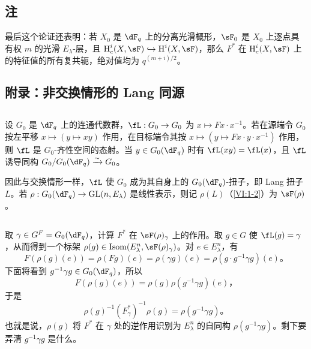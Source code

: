 \subsection{注}\label{VI:1-21}
最后这个论证还表明：若 $X_0$ 是 $\dF_q$ 上的分离光滑概形，$\sF_0$ 是 $X_0$ 上逐点具有权 $m$ 的光滑 $E_\lambda$-层，且 $\h_c^i(X,\sF)\hookrightarrow\h^i(X,\sF)$，那么 $F^\ast$ 在 $\h_c^i(X,\sF)$ 上的特征值的所有复共轭，绝对值均为 $q^{(m+i)/2}$。

\subsection*{附录：非交换情形的 Lang 同源}
\subsection{}\label{VI:1-22}
设 $G_0$ 是 $\dF_q$ 上的连通代数群，$\fL:G_0\to G_0$ 为 $x\mapsto Fx\cdot x^{-1}$。若在源端令 $G_0$ 按左平移 $x\mapsto(y\mapsto xy)$ 作用，在目标端令其按 $x\mapsto(y\mapsto Fx\cdot y\cdot x^{-1})$ 作用，则 $\fL$ 是 $G_0$-齐性空间的态射。当 $y\in G_0(\dF_q)$ 时有 $\fL(xy)=\fL(x)$，且 $\fL$ 诱导同构 $G_0/G_0(\dF_q)\iso G_0$。

因此与交换情形一样，$\fL$ 使 $G_0$ 成为其自身上的 $G_0(\dF_q)$-扭子，即 Lang 扭子 $L$。若 $\rho:G_0(\dF_q)\to\gl(n,E_\lambda)$ 是线性表示，则记 $\rho(L)$（\ref{VI:1-2}）为 $\sF(\rho)$。

\subsection{}\label{VI:1-23}
取 $\gamma\in G^F=G_0(\dF_q)$，计算 $F^\ast$ 在 $\sF(\rho)_\gamma$ 上的作用。取 $g\in G$ 使 $\fL(g)=\gamma$，从而得到一个标架
$\rho(g)\in\operatorname{Isom}(E_\lambda^n,\sF(\rho)_\gamma)$。对 $e\in E_\lambda^n$，有
\[
F(\rho(g)(e))=\rho(Fg)(e)=\rho(\gamma g)(e)=\rho(g\cdot g^{-1}\gamma g)(e)\text{。}
\]
下面将看到 $g^{-1}\gamma g\in G_0(\dF_q)$，所以
\[
F(\rho(g)(e))=\rho(g)\rho(g^{-1}\gamma g)(e)\text{，}
\]
于是
\begin{equation*}\tag{1.23.1}\label{VI:eq:1-23-1}
\rho(g)^{-1}(F_\gamma^\ast)^{-1}\rho(g)=\rho(g^{-1}\gamma g)\text{。}
\end{equation*}
也就是说，$\rho(g)$ 将 $F^\ast$ 在 $\gamma$ 处的逆作用识别为 $E_\lambda^n$ 的自同构 $\rho(g^{-1}\gamma g)$。剩下要弄清 $g^{-1}\gamma g$ 是什么。

